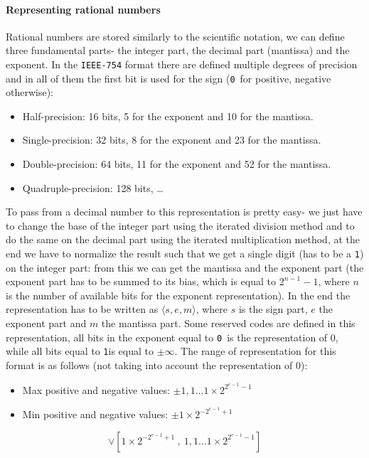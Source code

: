 \documentclass{scrartcl}
\newcommand{\zero}{\texttt{0}}
\newcommand{\one}{\texttt{1}}
\begin{document}
    \paragraph{Representing rational numbers}
    Rational numbers are stored similarly to the scientific notation, we can define three fundamental parts- the integer part, the decimal part (mantissa) and the exponent. In the \texttt{IEEE-754} format there are defined multiple degrees of precision and in all of them the first bit is used for the sign (\zero\ for positive, negative otherwise):
    \begin{itemize}
        \item Half-precision: 16 bits, 5 for the exponent and 10 for the mantissa.
        \item Single-precision: 32 bits, 8 for the exponent and 23 for the mantissa.
        \item Double-precision: 64 bits, 11 for the exponent and 52 for the mantissa.
        \item Quadruple-precision: 128 bits, \dots
    \end{itemize}
    To pass from a decimal number to this representation is pretty easy- we just have to change the base of the integer part using the iterated division method and to do the same on the decimal part using the iterated multiplication method, at the end we have to normalize the result such that we get a single digit (has to be a \one) on the integer part: from this we can get the mantissa and the exponent part (the exponent part has to be summed to its bias, which is equal to $2^{n-1}-1$, where $n$ is the number of available bits for the exponent representation). In the end the representation has to be written as $\langle s,e,m\rangle$, where $s$ is the sign part, $e$ the exponent part and $m$ the mantissa part.
    Some reserved codes are defined in this representation, all bits in the exponent equal to \zero\ is the representation of $0$, while all bits equal to \one is equal to $\pm\infty$. The range of representation for this format is as follows (not taking into account the representation of $0$):
    \begin{itemize}
        \item Max positive and negative values: $\pm 1,1\dots 1\times 2^{2^{e-1}-1}$
        \item Min positive and negative values: $\pm 1\times 2^{-2^{e-1}+1}$
    \end{itemize}
    \begin{equation*}
        [-1,1\dots 1\times 2^{2^{e-1}-1}\ ,\ -1\times 2^{-2^{e-1}+1}] \vee [1\times 2^{-2^{e-1}+1}\ ,\ 1,1\dots 1\times 2^{2^{e-1}-1}]
    \end{equation*}
\end{document}
